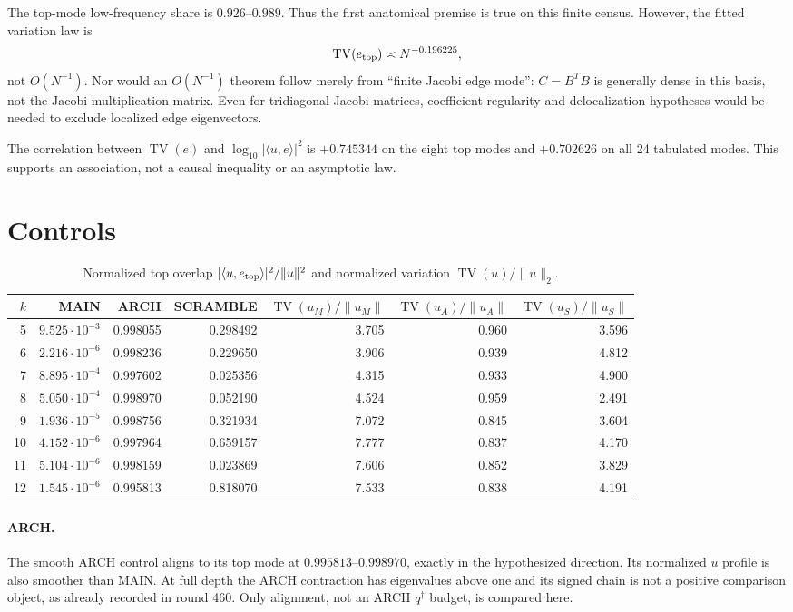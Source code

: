 \documentclass[11pt]{article}
\theoremstyle{remark}
\newcommand{\qdag}{q^{\dagger}}
\newcommand{\TV}{\operatorname{TV}}
\begin{document}
The top-mode low-frequency share is $0.926$--$0.989$.  Thus the first
anatomical premise is true on this finite census.  However, the fitted
variation law is
\[
 \TV(e_{\rm top})\asymp N^{-0.196225},
\]
not $O(N^{-1})$.  Nor would an $O(N^{-1})$ theorem follow merely from
``finite Jacobi edge mode'': $C=B^TB$ is generally dense in this basis,
not the Jacobi multiplication matrix.  Even for tridiagonal Jacobi
matrices, coefficient regularity and delocalization hypotheses would be
needed to exclude localized edge eigenvectors.

The correlation between $\TV(e)$ and
$\log_{10}|\langle u,e\rangle|^2$ is $+0.745344$ on the eight top modes
and $+0.702626$ on all 24 tabulated modes.  This supports an association,
not a causal inequality or an asymptotic law.

\section{Controls}

\begin{table}[ht]
\centering
\caption{Normalized top overlap
$|\langle u,e_{\rm top}\rangle|^2/\|u\|^2$ and normalized variation
$\TV(u)/\|u\|_2$.}
\label{tab:controls}
\small
\begin{tabular}{@{}rrrrrrr@{}}
\toprule
$k$&MAIN&ARCH&SCRAMBLE&
$\TV(u_M)/\|u_M\|$&$\TV(u_A)/\|u_A\|$&$\TV(u_S)/\|u_S\|$\\
\midrule
5 &$9.525{\cdot}10^{-3}$&0.998055&0.298492&3.705&0.960&3.596\\
6 &$2.216{\cdot}10^{-6}$&0.998236&0.229650&3.906&0.939&4.812\\
7 &$8.895{\cdot}10^{-4}$&0.997602&0.025356&4.315&0.933&4.900\\
8 &$5.050{\cdot}10^{-4}$&0.998970&0.052190&4.524&0.959&2.491\\
9 &$1.936{\cdot}10^{-5}$&0.998756&0.321934&7.072&0.845&3.604\\
10&$4.152{\cdot}10^{-6}$&0.997964&0.659157&7.777&0.837&4.170\\
11&$5.104{\cdot}10^{-6}$&0.998159&0.023869&7.606&0.852&3.829\\
12&$1.545{\cdot}10^{-6}$&0.995813&0.818070&7.533&0.838&4.191\\
\bottomrule
\end{tabular}
\end{table}

\paragraph{ARCH.}
The smooth ARCH control aligns to its top mode at
$0.995813$--$0.998970$, exactly in the hypothesized direction.
Its normalized $u$ profile is also smoother than MAIN.  At full depth
the ARCH contraction has eigenvalues above one and its signed chain is
not a positive comparison object, as already recorded in round 460.
Only alignment, not an ARCH $\qdag$ budget, is compared here.
\end{document}
